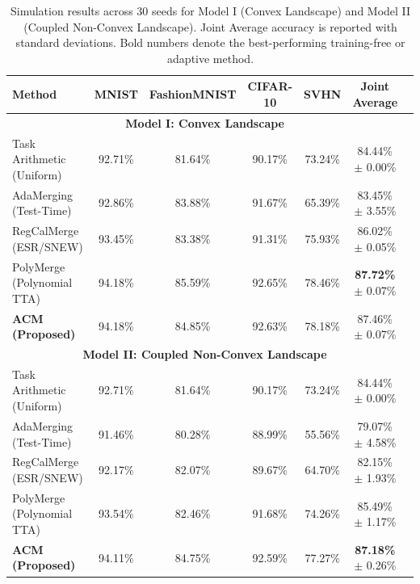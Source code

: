 \begin{table}[t]
\caption{Simulation results across 30 seeds for Model I (Convex Landscape) and Model II (Coupled Non-Convex Landscape). Joint Average accuracy is reported with standard deviations. Bold numbers denote the best-performing training-free or adaptive method.}
\label{tab:sim_results}
\vskip 0.15in
\begin{center}
\begin{small}
\begin{sc}
\begin{tabular}{lcccccr}
\toprule
Method & MNIST & FashionMNIST & CIFAR-10 & SVHN & Joint Average \\
\midrule
\multicolumn{6}{c}{\textbf{Model I: Convex Landscape}} \\
\midrule
Task Arithmetic (Uniform) & 92.71\% & 81.64\% & 90.17\% & 73.24\% & 84.44\% $\pm$ 0.00\% \\
AdaMerging (Test-Time)   & 92.86\% & 83.88\% & 91.67\% & 65.39\% & 83.45\% $\pm$ 3.55\% \\
RegCalMerge (ESR/SNEW)   & 93.45\% & 83.38\% & 91.31\% & 75.93\% & 86.02\% $\pm$ 0.05\% \\
PolyMerge (Polynomial TTA)& 94.18\% & 85.59\% & 92.65\% & 78.46\% & \textbf{87.72\%} $\pm$ 0.07\% \\
\textbf{ACM (Proposed)}    & 94.18\% & 84.85\% & 92.63\% & 78.18\% & 87.46\% $\pm$ 0.07\% \\
\midrule
\multicolumn{6}{c}{\textbf{Model II: Coupled Non-Convex Landscape}} \\
\midrule
Task Arithmetic (Uniform) & 92.71\% & 81.64\% & 90.17\% & 73.24\% & 84.44\% $\pm$ 0.00\% \\
AdaMerging (Test-Time)   & 91.46\% & 80.28\% & 88.99\% & 55.56\% & 79.07\% $\pm$ 4.58\% \\
RegCalMerge (ESR/SNEW)   & 92.17\% & 82.07\% & 89.67\% & 64.70\% & 82.15\% $\pm$ 1.93\% \\
PolyMerge (Polynomial TTA)& 93.54\% & 82.46\% & 91.68\% & 74.26\% & 85.49\% $\pm$ 1.17\% \\
\textbf{ACM (Proposed)}    & 94.11\% & 84.75\% & 92.59\% & 77.27\% & \textbf{87.18\%} $\pm$ 0.26\% \\
\bottomrule
\end{tabular}
\end{sc}
\end{small}
\end{center}
\vskip -0.1in
\end{table}


